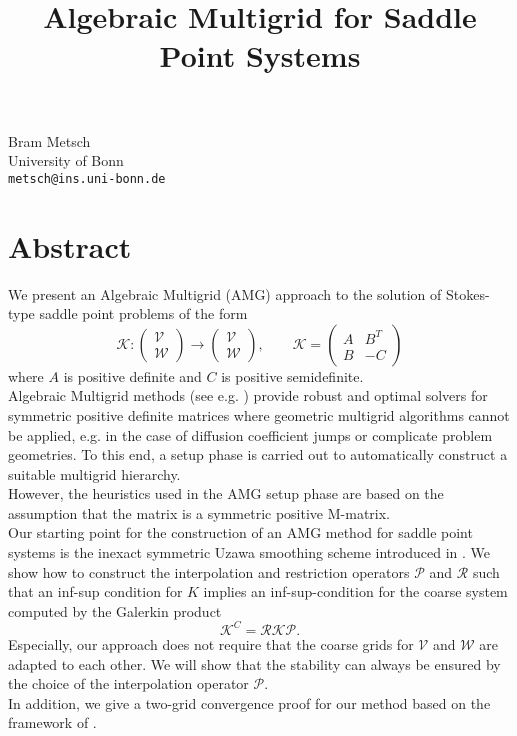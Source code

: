 \title{Algebraic Multigrid for Saddle Point Systems}
 \author{} \institute{}
\maketitle
\begin{center}
{\large Bram Metsch}\\
University of Bonn\\
{\tt metsch@ins.uni-bonn.de}

\end{center}

\section*{Abstract}

We present an Algebraic Multigrid (AMG) approach to the solution of Stokes-type saddle point problems of the form
\begin{equation*}
  \mathcal{K}: \begin{pmatrix} \mathcal{V} \\ \mathcal{W} \end{pmatrix} \rightarrow\begin{pmatrix} \mathcal{V} \\ \mathcal{W} \end{pmatrix}, \qquad  \mathcal{K} = \begin{pmatrix} A & B^T \\ B & -C \end{pmatrix}
\end{equation*}
where $A$ is positive definite and $C$ is positive semidefinite.\\
Algebraic Multigrid methods (see e.g. \cite{Ruge.Stueben:1987}) provide robust and optimal solvers for symmetric positive definite matrices where geometric multigrid algorithms cannot be applied, e.g. in the case of diffusion coefficient jumps or complicate problem geometries. To this end, a setup phase is carried out to automatically construct a suitable multigrid hierarchy.\\
However, the heuristics used in the AMG setup phase are based on the assumption that the matrix is a symmetric positive M-matrix.\\
%
Our starting point for the construction of an AMG method for saddle point systems is the inexact symmetric Uzawa smoothing scheme introduced in \cite{Schoeberl.Zulehner:2003}. We show how to construct the interpolation and restriction operators $\mathcal{P}$ and $\mathcal{R}$ such that an inf-sup condition for $K$ implies an inf-sup-condition for the coarse system computed by the Galerkin product
\begin{equation*}
\mathcal{K}^C = \mathcal{R} \mathcal{K} \mathcal{P}.
\end{equation*}
Especially, our approach does not require that the coarse grids for $\mathcal{V}$ and $\mathcal{W}$ are adapted to each other. We will show that the stability can always be ensured by the choice of the interpolation operator $\mathcal{P}$.\\
In addition, we give a two-grid convergence proof for our method based on the framework of \cite{Notay:2009}.

